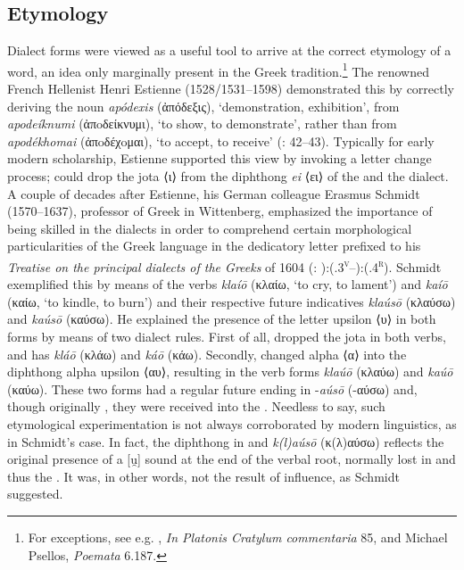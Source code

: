 \subsection{Etymology}

Dialect forms were viewed as a useful tool to arrive at the correct etymology of a word, an idea only marginally present in the Greek tradition.\footnote{For exceptions, see e.g. , \textit{In Platonis Cratylum commentaria} 85, and Michael Psellos, \textit{Poemata} 6.187.} The renowned French Hellenist Henri Estienne (1528/1531–1598) demonstrated this by correctly deriving the  noun \textit{apódexis} (ἀπόδεξις), ‘demonstration, exhibition’, from \textit{apodeíknumi} (ἀπoδείκνυμι), ‘to show, to demonstrate’, rather than from \textit{apodékhomai} (ἀπoδέχoμαι), ‘to accept, to receive’ (\citealt{Estienne1581}: 42–43). Typically for early modern scholarship, Estienne supported this view by invoking a letter change process;  could drop the jota ⟨ι⟩ from the diphthong \textit{ei} ⟨ει⟩ of the  and the  dialect. A couple of decades after Estienne, his German colleague Erasmus Schmidt (1570–1637), professor of Greek in Wittenberg, emphasized the importance of being skilled in the dialects in order to comprehend certain morphological particularities of the Greek language in the dedicatory letter prefixed to his \textit{Treatise on the principal dialects of the Greeks} of 1604 (\citealt{Schmidt1604}: {\footnotesize{):(}}.3\textsc{\textsuperscript{v}}–{\footnotesize{):(}}.4\textsc{\textsuperscript{r}}). Schmidt exemplified this by means of the  verbs \textit{klaíō} (κλαίω, ‘to cry, to lament’) and \textit{kaíō} (καίω, ‘to kindle, to burn’) and their respective future indicatives \textit{klaúsō} (κλαύσω) and \textit{kaúsō} (καύσω). He explained the presence of the letter upsilon ⟨υ⟩ in both forms by means of two dialect rules. First of all,  dropped the jota in both verbs, and has \textit{kláō} (κλάω) and \textit{káō} (κάω). Secondly,  changed alpha ⟨α⟩ into the diphthong alpha upsilon ⟨αυ⟩, resulting in the verb forms \textit{klaúō} (κλαύω) and \textit{kaúō} (καύω). These two  forms had a regular future ending in -\textit{aúsō} (-αύσω) and, though originally , they were received into the . Needless to say, such etymological experimentation is not always corroborated by modern linguistics, as in Schmidt’s case.{} In fact, the diphthong in  and  \textit{k(l)aúsō} (κ(λ)αύσω) reflects the original presence of a [u̯] sound at the end of the verbal root, normally lost in  and thus the . It was, in other words, not the result of  influence, as Schmidt suggested.


